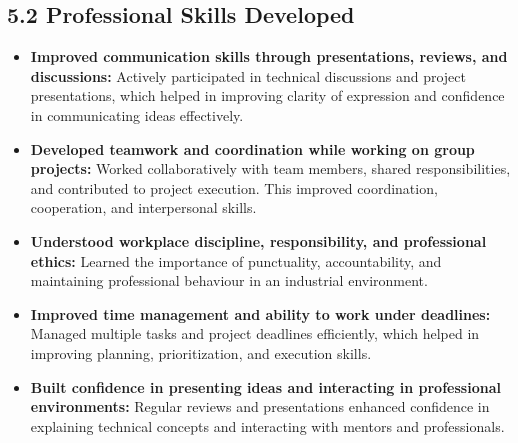 \documentclass[10pt]{article}
\begin{document}
\subsection*{5.2 Professional Skills Developed}
\begin{itemize}
\item \textbf{Improved communication skills through presentations, reviews, and discussions:}  
Actively participated in technical discussions and project presentations, which helped in improving clarity of expression and confidence in communicating ideas effectively.

\item \textbf{Developed teamwork and coordination while working on group projects:}  
Worked collaboratively with team members, shared responsibilities, and contributed to project execution. This improved coordination, cooperation, and interpersonal skills.

\item \textbf{Understood workplace discipline, responsibility, and professional ethics:}  
Learned the importance of punctuality, accountability, and maintaining professional behaviour in an industrial environment.

\item \textbf{Improved time management and ability to work under deadlines:}  
Managed multiple tasks and project deadlines efficiently, which helped in improving planning, prioritization, and execution skills.

\item \textbf{Built confidence in presenting ideas and interacting in professional environments:}  
Regular reviews and presentations enhanced confidence in explaining technical concepts and interacting with mentors and professionals.

\end{itemize}
\end{document}
